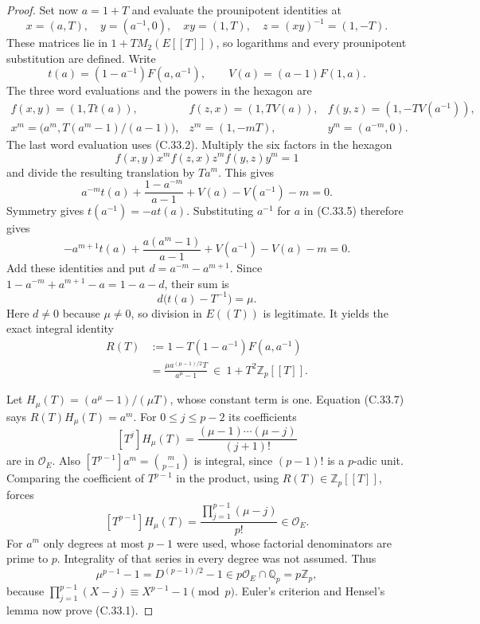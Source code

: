 \documentclass[11pt]{article}
\begin{document}
\begin{proof}
Set now $a=1+T$ and evaluate the prounipotent identities at
\[
 x=(a,T),\quad y=(a^{-1},0),\quad
 xy=(1,T),\quad z=(xy)^{-1}=(1,-T).                             \tag{C.33.3}
\]
These matrices lie in $1+T M_2(E[[T]])$, so logarithms and every
prounipotent substitution are defined. Write
\[
 t(a)=(1-a^{-1})F(a,a^{-1}),\qquad V(a)=(a-1)F(1,a).
\]
The three word evaluations and the powers in the hexagon are
\[
 \begin{array}{lll}
 f(x,y)=(1,Tt(a)),& f(z,x)=(1,TV(a)),&
 f(y,z)=(1,-TV(a^{-1})),\\[2pt]
 x^m=\bigl(a^m,T(a^m-1)/(a-1)\bigr),&
 z^m=(1,-mT),&y^m=(a^{-m},0).
 \end{array}                                                    \tag{C.33.4}
\]
The last word evaluation uses (C.33.2). Multiply the six factors
in the hexagon
\[
                    f(x,y)x^m f(z,x)z^m f(y,z)y^m=1
\]
and divide the resulting translation by $Ta^m$. This gives
\[
 a^{-m}t(a)+\frac{1-a^{-m}}{a-1}
                  +V(a)-V(a^{-1})-m=0.                         \tag{C.33.5}
\]
Symmetry gives $t(a^{-1})=-a t(a)$. Substituting $a^{-1}$ for
$a$ in (C.33.5) therefore gives
\[
 -a^{m+1}t(a)+\frac{a(a^m-1)}{a-1}
                  +V(a^{-1})-V(a)-m=0.                         \tag{C.33.6}
\]
Add these identities and put $d=a^{-m}-a^{m+1}$. Since
$1-a^{-m}+a^{m+1}-a=1-a-d$, their sum is
\[
                         d\bigl(t(a)-T^{-1}\bigr)=\mu.
\]
Here $d\ne0$ because $\mu\ne0$, so division in $E((T))$ is
legitimate. It yields the exact integral identity
\[
 \begin{split}
 R(T)&:=1-T(1-a^{-1})F(a,a^{-1})\\
     &=\frac{\mu a^{(\mu-1)/2}T}{a^\mu-1}
             \ \in\ 1+T^2\mathbb Z_p[[T]].
 \end{split}                                                    \tag{C.33.7}
\]

Let $H_\mu(T)=(a^\mu-1)/(\mu T)$, whose constant term is one.
Equation (C.33.7) says $R(T)H_\mu(T)=a^m$. For
$0\leq j\leq p-2$ its coefficients
\[
 [T^j]H_\mu(T)=\frac{(\mu-1)\cdots(\mu-j)}{(j+1)!}
\]
are in $\mathcal O_E$. Also
$[T^{p-1}]a^m=\binom{m}{p-1}$ is integral, since $(p-1)!$ is
a $p$-adic unit. Comparing the coefficient of $T^{p-1}$ in the
product, using $R(T)\in\mathbb Z_p[[T]]$, forces
\[
     [T^{p-1}]H_\mu(T)
       =\frac{\prod_{j=1}^{p-1}(\mu-j)}{p!}\in\mathcal O_E.
\]
For $a^m$ only degrees at most $p-1$ were used, whose factorial
denominators are prime to $p$. Integrality of that series in every
degree was not assumed. Thus
\[
 \mu^{p-1}-1=D^{(p-1)/2}-1\in p\mathcal O_E\cap\mathbb Q_p
                                      =p\mathbb Z_p,
\]
because $\prod_{j=1}^{p-1}(X-j)\equiv X^{p-1}-1\pmod p$.
Euler's criterion and Hensel's lemma now prove (C.33.1).


\end{proof}
\end{document}
